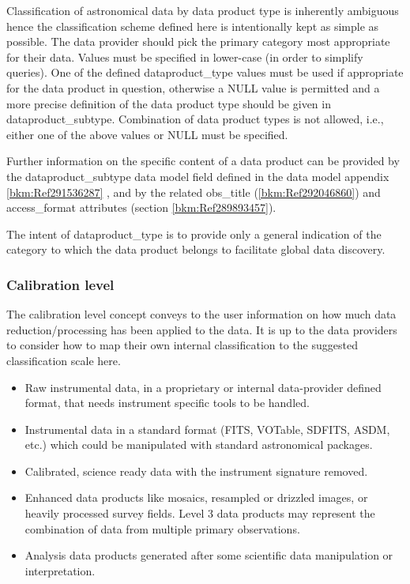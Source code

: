 \documentclass[11pt,a4paper]{ivoa}
\begin{document}
Classification of astronomical data by data product type is inherently ambiguous hence the classification scheme defined
here is intentionally kept as simple as possible.  The data provider should pick the primary category most appropriate
for their data. Values must be specified in lower-case (in order to simplify queries).  One of the defined
dataproduct\_type values must be used if appropriate for the data product in question, otherwise a NULL value is
permitted and a more precise definition of the data product type should be given in dataproduct\_subtype. Combination
of data product types is not allowed, i.e., either one of the above values or NULL must be specified.

Further information on the specific content of a data product can be provided by the dataproduct\_subtype data model
field defined in the data model appendix \ref{bkm:Ref291536287} , and by the related obs\_title
(\ref{bkm:Ref292046860}) and access\_format attributes (section \ref{bkm:Ref289893457}).

The intent of dataproduct\_type is to provide only a general indication of the category to which the data product
belongs to facilitate global data discovery.

\subsubsection{Calibration level}
\label{bkm:Ref158638048}\label{bkm:Ref287048333}The calibration level concept conveys to the user information on how
much data reduction/processing has been applied to the data.  It is up to the data providers to consider how to map
their own internal classification to the suggested classification scale here.

\begin{itemize}
\item[\textbf{Level 0:}]  Raw instrumental data, in a proprietary or internal data-provider defined format, that needs instrument
specific tools to be handled.

\item[\textbf{Level 1:}]  Instrumental data in a standard format (FITS, VOTable, SDFITS, ASDM, etc.) which could be manipulated with
standard astronomical packages.

\item[\textbf{Level 2:}] Calibrated, science ready data with the instrument signature removed.

\item[\textbf{Level 3:}] Enhanced data products like mosaics, resampled or drizzled images, or heavily processed survey fields.  Level 3
data products may represent the combination of data from multiple primary observations.

\item[\textbf{Level 4:}] Analysis data products generated after some scientific data manipulation or interpretation.
\end{itemize}
\end{document}
